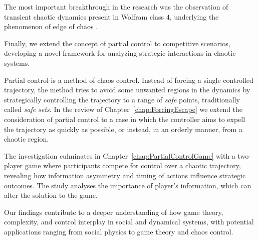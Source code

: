 The most important breakthrough in the research was the observation of transient chaotic dynamics present in Wolfram class $4$, underlying the phenomenon of edge of chaos \cite{EdgeChaos}. 

Finally, we extend the concept of partial control \cite{Yorke,DynamicsPartialControl,PartialControlBeyond,PartialControlFunctions} to competitive scenarios, developing a novel framework for analyzing strategic interactions in chaotic systems. 

Partial control is a method of chaos control. Instead of forcing a single controlled trajectory, the method tries to avoid some unwanted regions in the dynamics by strategically controlling the trajectory to a range of \textit{safe} points, traditionally called \textit{safe sets}. In the review of Chapter~\ref{chap:ForcingEscape} we extend the consideration of partial control to a case in which the controller aims to expell the trajectory as quickly as possible, or instead, in an orderly manner, from a chaotic region.

The investigation culminates in Chapter~\ref{chap:PartialControlGame} with a two-player game where participants compete for control over a chaotic trajectory, revealing how information asymmetry and timing of actions influence strategic outcomes. The study analyses the importance of player's information, which can alter the solution to the game.

Our findings contribute to a deeper understanding of how game theory, complexity, and control interplay in social and dynamical systems, with potential applications ranging from social physics to game theory and chaos control.











